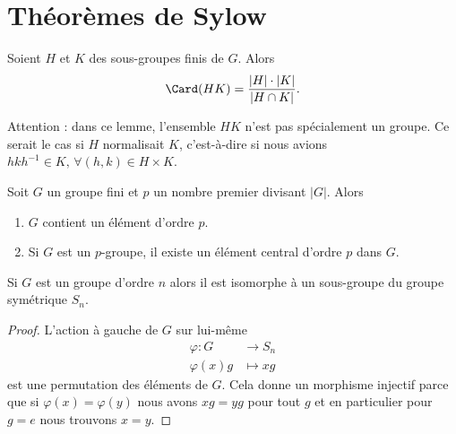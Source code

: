 
\section{Théorèmes de Sylow}

\begin{lemma}
    Soient \( H\) et \( K\) des sous-groupes finis de \( G\). Alors
    \begin{equation}
        \Card(HK)=\frac{ | H |\cdot | K | }{ | H\cap K | }.
    \end{equation}
\end{lemma}
Attention : dans ce lemme, l'ensemble \( HK\) n'est pas spécialement un groupe. Ce serait le cas si \( H\) normalisait \( K\), c'est-à-dire si nous avions \( hkh^{-1}\in K,\,\forall (h,k)\in H\times K\).

\begin{theorem}\label{ThoCauchyGpFini}
    Soit \( G\) un groupe fini et \( p\) un nombre premier divisant \( | G |\). Alors
    \begin{enumerate}
        \item
            \( G\) contient un élément d'ordre \( p\).
        \item
            Si \( G\) est un \( p\)-groupe, il existe un élément central d'ordre \( p\) dans \( G\).
    \end{enumerate}
\end{theorem}

\begin{lemma}    \label{ThoIfdlEB}   
    Si \( G\) est un groupe d'ordre \( n\) alors il est isomorphe à un sous-groupe du groupe symétrique \( S_n\).
\end{lemma}

\begin{proof}
    L'action à gauche de \( G\) sur lui-même
    \begin{equation}
        \begin{aligned}
            \varphi\colon G&\to S_n \\
            \varphi(x)g&\mapsto xg
        \end{aligned}
    \end{equation}
    est une permutation des éléments de \( G\). Cela donne un morphisme injectif parce que si \( \varphi(x)=\varphi(y)\) nous avons \( xg=yg\) pour tout \( g\) et en particulier pour \( g=e\) nous trouvons \( x=y\).
\end{proof}

